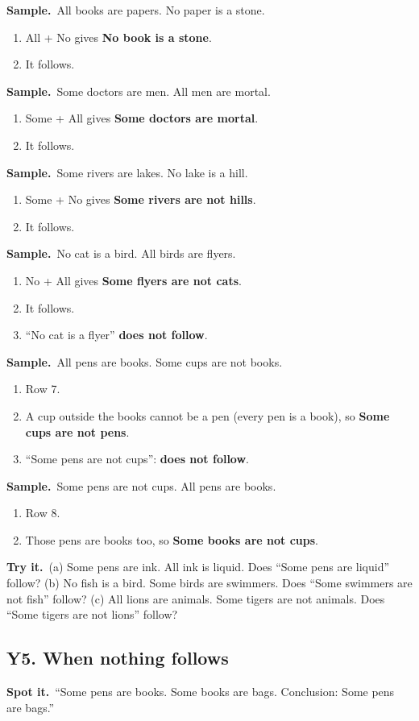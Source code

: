 \documentclass[11pt,a4paper]{article}
\let\oldsubsection\subsection
\renewcommand{\subsection}{\needspace{9\baselineskip}\oldsubsection}
\newcommand{\spot}{\textbf{\color{ember}Spot it.}\ }
\newif\ifkeepsamp
\newcommand{\samp}{\ifkeepsamp\needspace{4\baselineskip}\fi\textbf{\color{ember}Sample.}\ }
\newcommand{\tryit}[1]{\textbf{\color{ember}Try it.}\ #1}
\begin{document}
\samp All books are papers. No paper is a stone.
\begin{enumerate}
\item All + No gives \textbf{No book is a stone}.
\item It follows.
\end{enumerate}
\samp Some doctors are men. All men are mortal.
\begin{enumerate}
\item Some + All gives \textbf{Some doctors are mortal}.
\item It follows.
\end{enumerate}
\samp Some rivers are lakes. No lake is a hill.
\begin{enumerate}
\item Some + No gives \textbf{Some rivers are not hills}.
\item It follows.
\end{enumerate}
\samp No cat is a bird. All birds are flyers.
\begin{enumerate}
\item No + All gives \textbf{Some flyers are not cats}.
\item It follows.
\item ``No cat is a flyer'' \textbf{does not follow}.
\end{enumerate}
\samp All pens are books. Some cups are not books.
\begin{enumerate}
\item Row 7.
\item A cup outside the books cannot be a pen (every pen is a book), so \textbf{Some cups are not pens}.
\item ``Some pens are not cups'': \textbf{does not follow}.
\end{enumerate}
\samp Some pens are not cups. All pens are books.
\begin{enumerate}
\item Row 8.
\item Those pens are books too, so \textbf{Some books are not cups}.
\end{enumerate}

\tryit (a) Some pens are ink. All ink is liquid. Does ``Some pens are liquid'' follow? (b) No fish is a bird. Some birds are swimmers. Does ``Some swimmers are not fish'' follow? (c) All lions are animals. Some tigers are not animals. Does ``Some tigers are not lions'' follow?

\subsection{Y5. When nothing follows}
\spot ``Some pens are books. Some books are bags. Conclusion: Some pens are bags.''
\end{document}
